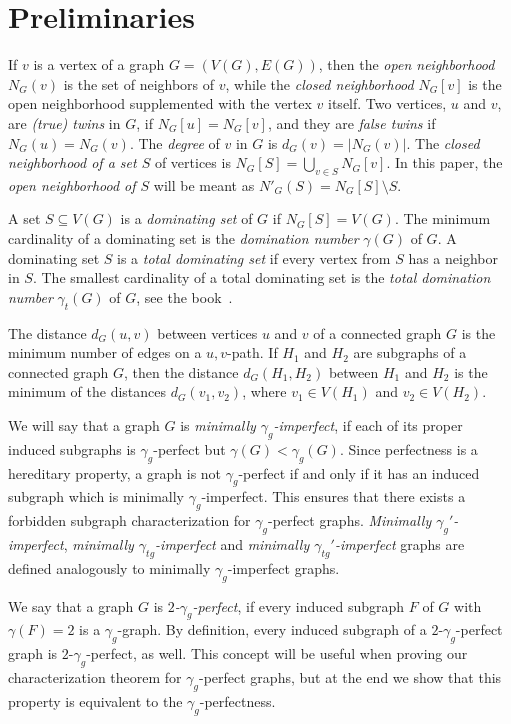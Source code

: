 \documentclass[12pt]{article}
\begin{document}
\section{Preliminaries}
\label{sec:preliminaries}

If $v$ is a vertex of a graph $G=(V(G), E(G))$, then the \emph{open neighborhood} $N_G(v)$ is the set of neighbors of $v$, while the \emph{closed neighborhood} $N_G[v]$ is the open neighborhood supplemented with the vertex $v$ itself. Two vertices, $u$ and $v$, are \emph{(true) twins} in $G$, if $N_G[u]=N_G[v]$, and they are \emph{false twins} if $N_G(u)=N_G(v)$. The \emph{degree} of $v$ in $G$ is $d_G(v)=|N_G(v)|$. The \emph{closed neighborhood of a set $S$} of vertices is $N_G[S]=\bigcup_{v \in S}N_G[v]$. In this paper, the \emph{open neighborhood of $S$} will be meant as $N'_G(S)= N_G[S]\setminus S$.

A set $S \subseteq V(G)$ is a \emph{dominating set} of $G$ if $N_G[S] = V(G)$. The minimum cardinality of a dominating set is the \emph{domination number} $\gamma(G)$ of $G$. A dominating set $S$ is a \emph{total dominating set} if every vertex from $S$ has a neighbor in $S$. The smallest cardinality of a total dominating set is the \emph{total domination number} $\gamma_{t}(G)$ of $G$, see the book~\cite{MHAYbookTD}. 

The distance $d_G(u,v)$ between vertices $u$ and $v$ of a connected graph $G$ is the minimum number of edges on a $u,v$-path. If $H_1$ and $H_2$ are subgraphs of a connected graph $G$, then the distance $d_G(H_1,H_2)$ between $H_1$ and $H_2$ is the minimum of the distances $d_G(v_1, v_2)$, where $v_1\in V(H_1)$ and $v_2\in V(H_2)$. 

We will say that a graph $G$ is \emph{minimally $\gamma_g$-imperfect}, if each of its proper induced subgraphs is $\gamma_g$-perfect but $\gamma(G) < \gamma_g(G)$. Since perfectness is a hereditary property, a graph is not $\gamma_g$-perfect if and only if it has an induced subgraph which is minimally $\gamma_g$-imperfect. This ensures that there exists a forbidden subgraph characterization for $\gamma_g$-perfect graphs.    \emph{Minimally $\gamma_g'$-imperfect}, \emph{minimally $\gamma_{tg}$-imperfect} and \emph{minimally $\gamma_{tg}'$-imperfect} graphs are defined analogously to minimally $\gamma_g$-imperfect graphs.

We say that a graph $G$ is \emph{$2$-$\gamma_g$-perfect}, if every induced subgraph $F$ of $G$ with $\gamma(F)=2$ is a $\gamma_g$-graph. By definition, every induced subgraph of a $2$-$\gamma_g$-perfect graph is $2$-$\gamma_g$-perfect, as well. This concept will be useful when proving our characterization theorem for $\gamma_g$-perfect graphs, but at the end we show that this property is equivalent to the $\gamma_g$-perfectness.
\end{document}
